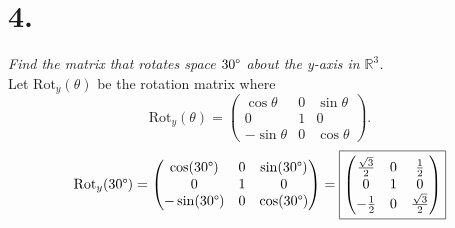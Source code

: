 \documentclass[12pt]{article}
\begin{document}
\section*{4.}
\textit{Find the matrix that rotates space $30 \degree$ about the y-axis in
$\mathbb{R}^3$.}
\\[\baselineskip]
Let $\text{Rot}_y(\theta)$ be the rotation matrix where
\begin{equation*}
	\text{Rot}_y(\theta) =
	\begin{pmatrix}
		\cos \theta & 0 & \sin \theta \\
		0 & 1 & 0 \\
		-\sin \theta & 0 & \cos \theta
	\end{pmatrix}
	.
\end{equation*}
\begin{equation*}
	\text{Rot}_y(30 \degree)
	=
	\begin{pmatrix}
		\cos(30 \degree) & 0 & \sin(30 \degree) \\
		0 & 1 & 0 \\
		-\sin(30 \degree) & 0 & \cos(30 \degree)
	\end{pmatrix}
	=
	\boxed{
		\begin{pmatrix}
			\frac{\sqrt{3}}{2} & 0 & \frac{1}{2} \\
			0 & 1 & 0 \\
			-\frac{1}{2} & 0 & \frac{\sqrt{3}}{2}
		\end{pmatrix}
	}
\end{equation*}
\end{document}
